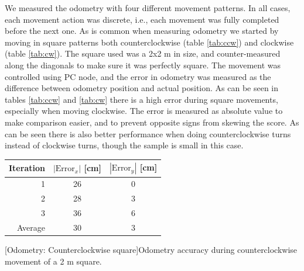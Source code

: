 \documentclass[11pt]{article}
\begin{document}
We measured the odometry with four different movement patterns. In all cases,
each movement action was discrete, i.e., each movement was fully completed
before the next one. As is common when measuring odometry we started by moving
in square patterns both counterclockwise (table \vref{tab:ccw}) and clockwise
(table \vref{tab:cw}). The square used was a 2x2 m in size, and counter-measured
along the diagonals to make sure it was perfectly square. The movement was
controlled using PC node, and the error in odometry was measured as the
difference between odometry position and actual position. As can be seen in
tables \ref{tab:ccw} and \ref{tab:cw} there is a high error during square
movements, especially when moving clockwise. The error is measured as absolute
value to make comparison easier, and to prevent opposite signs from skewing the
score. As can be seen there is also  better performance when doing
counterclockwise turns instead of clockwise turns, though the sample is
small in this case. \par

\begin{center}
  \begin{tabular}{r|cc}
    Iteration & $|\text{Error}_x|$ [cm] & $|\text{Error}_y|$ [cm] \\ \hline
    1 & 26 & 0 \\
    2 & 28 & 3 \\
    3 & 36 & 6 \\ \hline
    Average & 30 & 3             
  \end{tabular}
  [Odometry: Counterclockwise square]{Odometry accuracy during
    counterclockwise movement of a 2 m square.\label{tab:ccw}}
\end{center}\par
\end{document}
